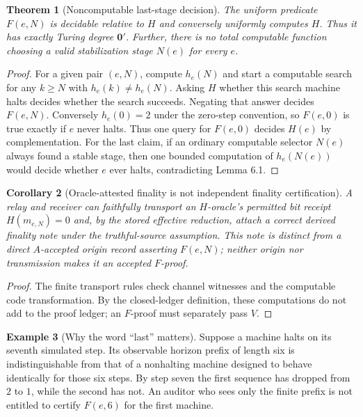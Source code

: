 \documentclass[11pt,letterpaper]{article}
\newtheorem{theorem}{Theorem}[section]\newtheorem{lemma}[theorem]{Lemma}\newtheorem{proposition}[theorem]{Proposition}\newtheorem{corollary}[theorem]{Corollary}\theoremstyle{definition}\newtheorem{definition}[theorem]{Definition}\newtheorem{example}[theorem]{Example}\newtheorem{remark}[theorem]{Remark}\newtheorem{conjecture}[theorem]{Conjecture}
\begin{document}
\begin{theorem}[Noncomputable last-stage decision]
The uniform predicate $F(e,N)$ is decidable relative to $H$ and conversely uniformly computes $H$. Thus it has exactly Turing degree $\mathbf 0'$. Further, there is no total computable function choosing a valid stabilization stage $N(e)$ for every $e$.
\end{theorem}
\begin{proof}
For a given pair $(e,N)$, compute $h_e(N)$ and start a computable search for any $k\ge N$ with $h_e(k)\ne h_e(N)$. Asking $H$ whether this search machine halts decides whether the search succeeds. Negating that answer decides $F(e,N)$. Conversely $h_e(0)=2$ under the zero-step convention, so $F(e,0)$ is true exactly if $e$ never halts. Thus one query for $F(e,0)$ decides $H(e)$ by complementation. For the last claim, if an ordinary computable selector $N(e)$ always found a stable stage, then one bounded computation of $h_e(N(e))$ would decide whether $e$ ever halts, contradicting Lemma 6.1.
\end{proof}
\begin{corollary}[Oracle-attested finality is not independent finality certification]
A relay and receiver can faithfully transport an $H$-oracle's permitted bit receipt $H(m_{e,N})=0$ and, by the stored effective reduction, attach a correct derived finality note under the truthful-source assumption. This note is distinct from a direct $A$-accepted origin record asserting $F(e,N)$; neither origin nor transmission makes it an accepted $F$-proof.
\end{corollary}
\begin{proof}
The finite transport rules check channel witnesses and the computable code transformation. By the closed-ledger definition, these computations do not add to the proof ledger; an $F$-proof must separately pass $V$.
\end{proof}
\begin{example}[Why the word ``last'' matters]
Suppose a machine halts on its seventh simulated step. Its observable horizon prefix of length six is indistinguishable from that of a nonhalting machine designed to behave identically for those six steps. By step seven the first sequence has dropped from $2$ to $1$, while the second has not. An auditor who sees only the finite prefix is not entitled to certify $F(e,6)$ for the first machine.
\end{example}
\end{document}
